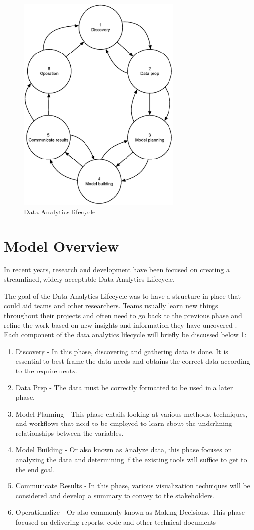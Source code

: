 \begin{figure}[htbp]
\centering
\includegraphics[width=8cm]{./figures/datalifecycle.eps}
\caption{Data Analytics lifecycle}
\label{fig:lifecycle}
\end{figure}

\section{Model Overview}
In recent years, research and development have been focused on creating a streamlined, widely acceptable Data Analytics Lifecycle. 

The goal of the Data Analytics Lifecycle was to have a structure in place that could aid teams and other researchers. Teams usually learn new things throughout their projects and often need to go back to the previous phase and refine the work based on new insights and information they have uncovered \cite{dietrich2015data}.
Each component of the data analytics lifecycle will briefly be discussed below \ref{fig:lifecycle}:
\begin{enumerate}
    \item Discovery - In this phase, discovering and gathering data is done. It is essential to best frame the data needs and obtains the correct data according to the requirements.
    \item Data Prep - The data must be correctly formatted to be used in a later phase. 
    \item Model Planning - This phase entails looking at various methods, techniques, and workflows that need to be employed to learn about the underlining relationships between the variables. 
    \item Model Building - Or also known as Analyze data, this phase focuses on analyzing the data and determining if the existing tools will suffice to get to the end goal.
    \item Communicate Results - In this phase, various visualization techniques will be considered and develop a summary to convey to the stakeholders.
    \item Operationalize - Or also commonly known as Making Decisions. This phase focused on delivering reports, code and other technical documents
\end{enumerate}

